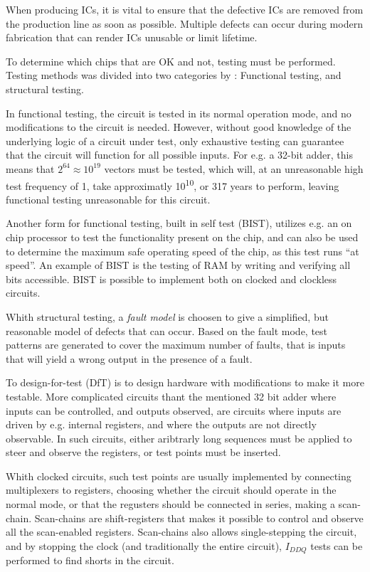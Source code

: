When producing ICs, it is vital to ensure that the defective ICs are
removed from the production line as soon as possible. Multiple defects
can occur during modern fabrication that can render ICs unusable or
limit lifetime.

To determine which chips that are OK and not, testing must be
performed. Testing methods was divided into two categories by
\cite{xxx}: Functional testing, and structural testing.

In functional testing, the circuit is tested in its normal operation
mode, and no modifications to the circuit is needed. However, without
good knowledge of the underlying logic of a circuit under test, only
exhaustive testing can guarantee that the circuit will function for
all possible inputs. For e.g. a 32-bit adder, this means that $2^{64}
\approx 10^{19}$ vectors must be tested, which will, at an
unreasonable high test frequency of \unit{1}{\giga \hertz}, take
approximatly \unit{10^{10}}{\second}, or 317 years to perform, leaving
functional testing unreasonable for this circuit.

Another form for functional testing, built in self test (BIST),
utilizes e.g. an on chip processor to test the functionality present
on the chip, and can also be used to determine the maximum safe
operating speed of the chip, as this test runs ``at speed''. An
example of BIST is the testing of RAM by writing and verifying all
bits accessible. BIST is possible to implement both on clocked and
clockless circuits.

Whith structural testing, a \emph{fault model} is choosen to give a
simplified, but reasonable model of defects that can occur. Based on
the fault mode, test patterns are generated to cover the maximum
number of faults, that is inputs that will yield a wrong output in the
presence of a fault.

To design-for-test (DfT) is to design hardware with modifications to
make it more testable. More complicated circuits thant the mentioned
32 bit adder where inputs can be controlled, and outputs observed, are
circuits where inputs are driven by e.g. internal registers, and where
the outputs are not directly observable. In such circuits, either
aribtrarly long sequences must be applied to steer and observe the
registers, or test points must be inserted.

Whith clocked circuits, such test points are usually implemented by
connecting multiplexers to registers, choosing whether the circuit
should operate in the normal mode, or that the regusters should be
connected in series, making a scan-chain. Scan-chains are
shift-registers that makes it possible to control and observe all the
scan-enabled registers. Scan-chains also allows single-stepping the
circuit, and by stopping the clock (and traditionally the entire
circuit), $I_{DDQ}$ tests can be performed to find shorts in the
circuit.

